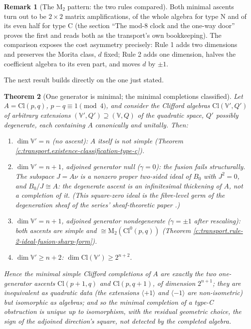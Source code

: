 \documentclass[11pt]{article}
\newtheorem{theorem}{Theorem}[section]
\theoremstyle{definition}
\newtheorem{remark}[theorem]{Remark}
\theoremstyle{plain}
\newcommand{\changedmark}[2]{\marginpar{\raggedright\scriptsize\color{#1}#2}}
\providecommand{\Cl}{}\renewcommand{\Cl}{\mathrm{Cl}}
\providecommand{\Mat}{}\renewcommand{\Mat}{\mathrm{M}}
\begin{document}
\begin{remark}[The $\Mat_2$ pattern: the two rules compared]\label{c:note.transport.2-pattern-two-rules-compared}
Both minimal ascents turn out to be $2 \times 2$ matrix amplifications, of the whole algebra for type N and of its even half for type C (the section ``The mod-8 clock and the one-way door'' proves the first and reads both as the transport's own bookkeeping). The comparison exposes the cost asymmetry precisely: Rule 1 adds two dimensions and preserves the Morita class, $d$ fixed; Rule 2 adds one dimension, halves the coefficient algebra to its even part, and moves $d$ by $\pm 1$.
\end{remark}

The next result builds directly on the one just stated.

\begin{theorem}[One generator is minimal; the minimal completions classified]\label{c:transport.one-generator-minimal-minimal-completions-classified}
\changedmark{gray}{reworded}
Let $A = \Cl(p,q)$, $p - q \equiv 1 \pmod 4$, and consider the Clifford algebras $\Cl(\mathbb{V}', Q')$ of arbitrary extensions $(\mathbb{V}', Q') \supseteq (\mathbb{V}, Q)$ of the quadratic space, $Q'$ possibly degenerate, each containing $A$ canonically and unitally. Then:
\begin{enumerate}
\item $\dim \mathbb{V}' = n$ (no ascent): $A$ itself is not simple (Theorem \ref{c:transport.existence-classification-type-c}).
\item $\dim \mathbb{V}' = n + 1$, adjoined generator null ($\gamma = 0$): the fusion fails structurally. The subspace $J = A\nu$ is a nonzero proper two-sided ideal of $B_0$ with $J^2 = 0$, and $B_0 / J \cong A$: the degenerate ascent is an infinitesimal thickening of $A$, not a completion of it. (This square-zero ideal is the fibre-level germ of the degeneration sheaf of the series' sheaf-theoretic paper \cite{ButlerT4}.)
\item $\dim \mathbb{V}' = n + 1$, adjoined generator nondegenerate ($\gamma = \pm 1$ after rescaling): both ascents are simple and $\cong \Mat_2(\Cl^0(p,q))$ (Theorem \ref{c:transport.rule-2-ideal-fusion-sharp-form}).
\item $\dim \mathbb{V}' \geq n + 2$: $\dim \Cl(\mathbb{V}') \geq 2^{n+2}$.
\end{enumerate}
Hence the minimal simple Clifford completions of $A$ are exactly the two one-generator ascents $\Cl(p{+}1,q)$ and $\Cl(p,q{+}1)$, of dimension $2^{n+1}$; they are inequivalent as quadratic data (the extensions $\langle +1 \rangle$ and $\langle -1 \rangle$ are non-isometric) but isomorphic as algebras; and so the minimal completion of a type-C obstruction is \emph{unique up to isomorphism}, with the residual geometric choice, the sign of the adjoined direction's square, not detected by the completed algebra.
\end{theorem}
\end{document}
